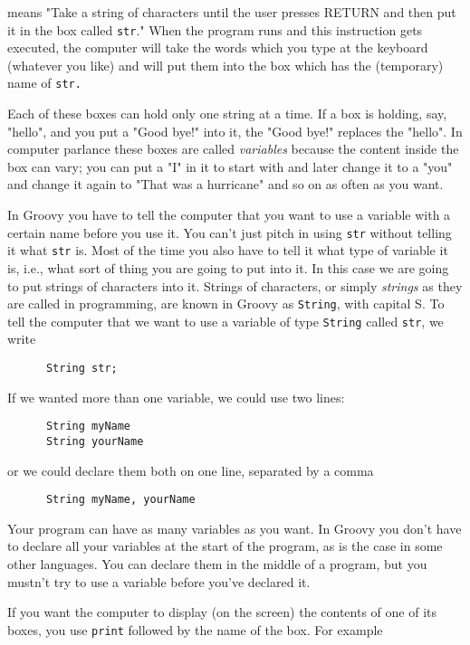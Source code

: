 means "Take a string of characters until the user presses RETURN and
then put it in the box called \verb!str!."  When the program runs and
this instruction gets executed, the computer will take the words which
you type at the keyboard (whatever you like) and will put them into
the box which has the (temporary) name of \verb!str.!

Each of these boxes can hold only one string at a time.  If a box is
holding, say, "hello", and you put a "Good bye!" into it, the
"Good bye!" replaces the "hello".  In computer parlance these
boxes are called \emph{variables} because the content inside the box
can vary; you can put a "I" in it to start with and later change it
to a "you" and change it again to "That was a hurricane" and so on
as often as you want.

In Groovy you have to tell the computer that you want to use a variable
with a certain name before you use it.  You can't just pitch in using \verb!str!
without telling it what \verb!str! is.  Most of the time you also have to
tell it what type of variable it is, i.e., what sort of thing you are going
to put into it.  In this case we are going to put strings of characters into it.
Strings of characters, or simply \emph{strings} as they are called in programming, are
known in Groovy as \verb!String!, with capital S.  To tell the computer that we want to use a
variable of type \verb!String! called \verb!str!, we write

\begin{Verbatim}
      String str;
\end{Verbatim}

If we wanted more than one variable, we could use two lines:

\begin{Verbatim}
      String myName
      String yourName
\end{Verbatim}

or we could declare them both on one line, separated by a comma
\begin{Verbatim}
      String myName, yourName
\end{Verbatim}

Your program can have as many variables as you want.  In Groovy you don't
have to declare all your variables at the start of the program, as is the
case in some other languages.  You can declare them in the middle of a
program, but you mustn't try to use a variable before you've declared it.

If you want the computer to display (on the screen) the contents of one of
its boxes, you use \verb!print! followed by the name
of the box.  For example

